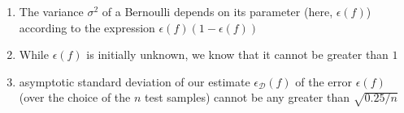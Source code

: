 \begin{enumerate}[itemsep=0.2cm]
    \item The variance $\sigma^2$ of a Bernoulli depends on its parameter (here, $\epsilon(f)$) according to the expression $\epsilon(f)(1-\epsilon(f))$

    \item While $\epsilon(f)$ is initially unknown, we know that it cannot be greater than $1$

    \item asymptotic standard deviation of our estimate $\epsilon_\mathcal{D}(f)$ of the error $\epsilon(f)$ (over the choice of the $n$ test samples) cannot be any greater than $\sqrt{0.25/n}$



\end{enumerate}




\vspace{0.5cm}

